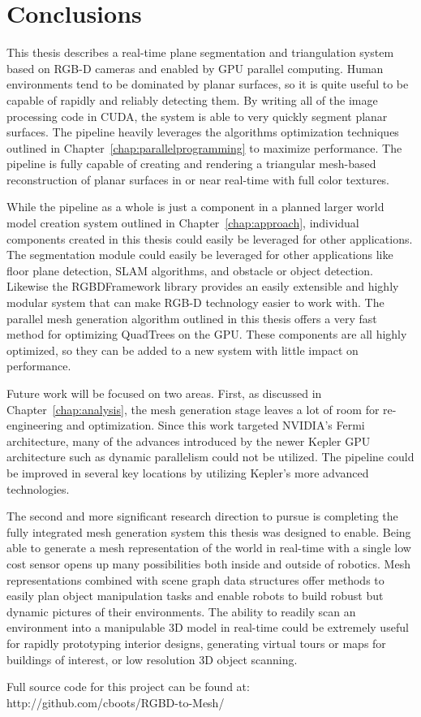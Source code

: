 \chapter{Conclusions}
\label{chap:conclusions}
This thesis describes a real-time plane segmentation and triangulation system based on RGB-D cameras and enabled by GPU parallel computing. Human environments tend to be dominated by planar surfaces, so it is quite useful to be capable of rapidly and reliably detecting them. By writing all of the image processing code in CUDA, the system is able to very quickly segment planar surfaces. The pipeline heavily leverages the algorithms optimization techniques outlined in Chapter~\ref{chap:parallelprogramming} to maximize performance. The pipeline is fully capable of creating and rendering a triangular mesh-based reconstruction of planar surfaces in or near real-time with full color textures.\par
While the pipeline as a whole is just a component in a planned larger world model creation system outlined in Chapter~\ref{chap:approach}, individual components created in this thesis could easily be leveraged for other applications. The segmentation module could easily be leveraged for other applications like floor plane detection, SLAM algorithms, and obstacle or object detection. Likewise the RGBDFramework library provides an easily extensible and highly modular system that can make RGB-D technology easier to work with. The parallel mesh generation algorithm outlined in this thesis offers a very fast method for optimizing QuadTrees on the GPU. These components are all highly optimized, so they can be added to a new system with little impact on performance.\par
Future work will be focused on two areas. First, as discussed in Chapter~\ref{chap:analysis}, the mesh generation stage leaves a lot of room for re-engineering and optimization. Since this work targeted NVIDIA's Fermi architecture, many of the advances introduced by the newer Kepler GPU architecture such as dynamic parallelism could not be utilized. The pipeline could be improved in several key locations by utilizing Kepler's more advanced technologies.\par
The second and more significant research direction to pursue is completing the fully integrated mesh generation system this thesis was designed to enable. Being able to generate a mesh representation of the world in real-time with a single low cost sensor opens up many possibilities both inside and outside of robotics. Mesh representations combined with scene graph data structures offer methods to easily plan object manipulation tasks and enable robots to build robust but dynamic pictures of their environments. The ability to readily scan an environment into a manipulable 3D model in real-time could be extremely useful for rapidly prototyping interior designs, generating virtual tours or maps for buildings of interest, or low resolution 3D object scanning.

Full source code for this project can be found at: http://github.com/cboots/RGBD-to-Mesh/